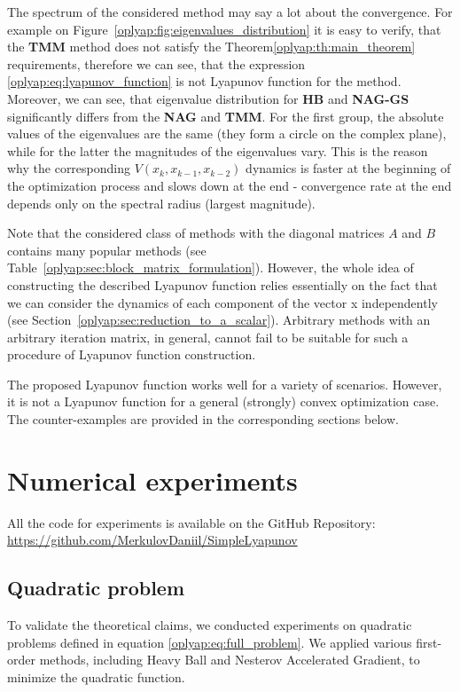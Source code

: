 \documentclass[a4paper,11pt]{article}
\begin{document}
The spectrum of the considered method may say a lot about the convergence. For example on Figure~\ref{oplyap:fig:eigenvalues_distribution} it is easy to verify, that the \textbf{TMM} method does not satisfy the Theorem\ref{oplyap:th:main_theorem} requirements, therefore we can see, that the expression \eqref{oplyap:eq:lyapunov_function} is not Lyapunov function for the method. Moreover, we can see, that eigenvalue distribution for \textbf{HB} and \textbf{NAG-GS} significantly differs from the \textbf{NAG} and \textbf{TMM}. For the first group, the absolute values of the eigenvalues are the same (they form a circle on the complex plane), while for the latter the magnitudes of the eigenvalues vary. This is the reason why the corresponding $V(x_k, x_{k-1}, x_{k-2})$ dynamics is faster at the beginning of the optimization process and slows down at the end - convergence rate at the end depends only on the spectral radius (largest magnitude).

Note that the considered class of methods with the diagonal matrices $A$ and $B$ contains many popular methods (see Table~\ref{oplyap:sec:block_matrix_formulation}). However, the whole idea of constructing the described Lyapunov function relies essentially on the fact that we can consider the dynamics of each component of the vector x independently (see Section~\ref{oplyap:sec:reduction_to_a_scalar}). Arbitrary methods with an arbitrary iteration matrix, in general, cannot fail to be suitable for such a procedure of Lyapunov function construction.

The proposed Lyapunov function works well for a variety of scenarios. However, it is not a Lyapunov function for a general (strongly) convex optimization case. The counter-examples are provided in the corresponding sections below.

\section{Numerical experiments}

All the code for experiments is available on the GitHub Repository: \\ \href{https://github.com/MerkulovDaniil/SimpleLyapunov}{https://github.com/MerkulovDaniil/SimpleLyapunov}

\subsection{Quadratic problem}
To validate the theoretical claims, we conducted experiments on quadratic problems defined in equation \eqref{oplyap:eq:full_problem}. We applied various first-order methods, including Heavy Ball and Nesterov Accelerated Gradient, to minimize the quadratic function.
\end{document}
